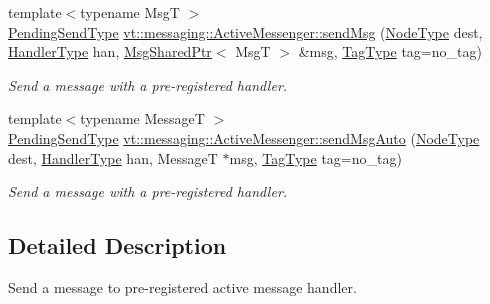 \begin{DoxyCompactItemize}
{\footnotesize template$<$typename MsgT $>$ }\\\hyperlink{structvt_1_1messaging_1_1_active_messenger_a3626a6ca76d8ad4ec7c3b47a2c70d3a8}{Pending\+Send\+Type} \hyperlink{group__preregister_ga16e324b8bb564227e5b396c4a10ec4bd}{vt\+::messaging\+::\+Active\+Messenger\+::send\+Msg} (\hyperlink{namespacevt_a866da9d0efc19c0a1ce79e9e492f47e2}{Node\+Type} dest, \hyperlink{namespacevt_af64846b57dfcaf104da3ef6967917573}{Handler\+Type} han, \hyperlink{structvt_1_1messaging_1_1_msg_shared_ptr}{Msg\+Shared\+Ptr}$<$ MsgT $>$ \&msg, \hyperlink{namespacevt_a84ab281dae04a52a4b243d6bf62d0e52}{Tag\+Type} tag=no\+\_\+tag)
\begin{DoxyCompactList}\small\item\em Send a message with a pre-\/registered handler. \end{DoxyCompactList}\item 
{\footnotesize template$<$typename MessageT $>$ }\\\hyperlink{structvt_1_1messaging_1_1_active_messenger_a3626a6ca76d8ad4ec7c3b47a2c70d3a8}{Pending\+Send\+Type} \hyperlink{group__preregister_ga0bae3a37f8fe6be59bac4e8e4b35aaba}{vt\+::messaging\+::\+Active\+Messenger\+::send\+Msg\+Auto} (\hyperlink{namespacevt_a866da9d0efc19c0a1ce79e9e492f47e2}{Node\+Type} dest, \hyperlink{namespacevt_af64846b57dfcaf104da3ef6967917573}{Handler\+Type} han, MessageT $\ast$msg, \hyperlink{namespacevt_a84ab281dae04a52a4b243d6bf62d0e52}{Tag\+Type} tag=no\+\_\+tag)
\begin{DoxyCompactList}\small\item\em Send a message with a pre-\/registered handler. \end{DoxyCompactList}\end{DoxyCompactItemize}


\subsection{Detailed Description}
Send a message to pre-\/registered active message handler. 


